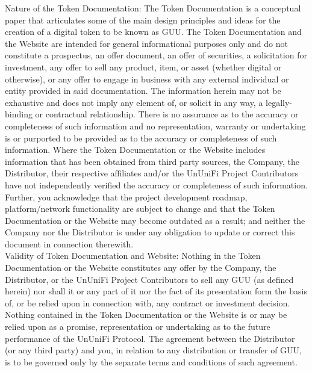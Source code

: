 \documentclass[dvipdfmx]{jsarticle}
\begin{document}
Nature of the Token Documentation: The Token Documentation is a conceptual paper that articulates some of the main design principles and ideas for the creation of a digital token to be known as GUU. The Token Documentation and the Website are intended for general informational purposes only and do not constitute a prospectus, an offer document, an offer of securities, a solicitation for investment, any offer to sell any product, item, or asset (whether digital or otherwise), or any offer to engage in business with any external individual or entity provided in said documentation. The information herein may not be exhaustive and does not imply any element of, or solicit in any way, a legally-binding or contractual relationship. There is no assurance as to the accuracy or completeness of such information and no representation, warranty or undertaking is or purported to be provided as to the accuracy or completeness of such information. Where the Token Documentation or the Website includes information that has been obtained from third party sources, the Company, the Distributor, their respective affiliates and/or the UnUniFi Project Contributors have not independently verified the accuracy or completeness of such information. Further, you acknowledge that the project development roadmap, platform/network functionality are subject to change and that the Token Documentation or the Website may become outdated as a result; and neither the Company nor the Distributor is under any obligation to update or correct this document in connection therewith.\\
Validity of Token Documentation and Website: Nothing in the Token Documentation or the Website constitutes any offer by the Company, the Distributor, or the UnUniFi Project Contributors to sell any GUU (as defined herein) nor shall it or any part of it nor the fact of its presentation form the basis of, or be relied upon in connection with, any contract or investment decision. Nothing contained in the Token Documentation or the Website is or may be relied upon as a promise, representation or undertaking as to the future performance of the UnUniFi Protocol. The agreement between the Distributor (or any third party) and you, in relation to any distribution or transfer of GUU, is to be governed only by the separate terms and conditions of such agreement.\\
\end{document}
